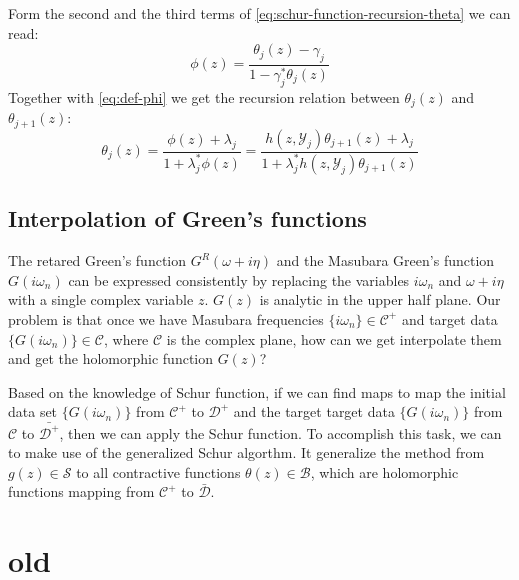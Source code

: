 \documentclass[
	preprint,%
	aps,
	prb,
	showpacs,	
	amsmath, amssymb]{revtex4-2}
\DeclareRobustCommand{\+}{\hstretch{1.25} {\boldsymbol {\mathrel{+}}}}
\newcommand{\Y}{ {\mathcal{Y}} }
\newcommand{\C}{ {\mathcal{C}} }
\newcommand{\D}{ {\mathcal{D}} }
\newcommand{\Dbar}{ {\bar{\mathcal{D}}} }
\newcommand{\B}{ {\mathcal{B}} }
\begin{document}
Form the second and the third terms of \cref{eq:schur-function-recursion-theta}
we can read:
\begin{equation}\label{eq:phi-theta-j}
	\phi(z)
	= \frac{\theta_j(z) - \gamma_j}{1 - \gamma_j^* \theta_j(z)}
\end{equation}
Together with \cref{eq:def-phi} we get the recursion relation between 
$\theta_j(z)$ and $\theta_{j+1}(z)$:
\begin{equation}\label{eq:recursion-relation-theta}
	\theta_j(z) = \frac{\phi(z) + \lambda_j}{1 + \lambda_j^*\phi(z)}
		= \frac{h(z, \Y_j) \theta_{j+1}(z)  + \lambda_j}
			{1 + \lambda_j^*h(z, \Y_j) \theta_{j+1}(z) }
\end{equation}

\subsection{Interpolation of Green's functions}
\label{subsec:interpolation-of-GF}

The retared Green's function $G^R(\omega + i\eta)$ and the Masubara 
Green's function $G(i\omega_n)$ can be expressed consistently by replacing 
the variables $i\omega_n$ and $\omega + i\eta$ with a single complex 
variable $z$. $G(z)$ is analytic in the upper half plane. 
Our problem is that once we have Masubara frequencies $\{i\omega_n\} \in \C^+$ 
and target data $\{ G(i\omega_n)\} \in \C$, where $\C$ is 
the complex plane, how can we get interpolate them and get the 
holomorphic function $G(z)$?

Based on the knowledge of Schur function, if we can find maps 
to map the initial data set $\{ G(i\omega_n)\}$
from $\C^+$ to $\D^+$ and the target 
target data $\{ G(i\omega_n)\}$ from $\C$ to $\bar{\D^+}$, 
then we can apply the Schur function. 
To accomplish this task, we can to make use of the generalized 
Schur algorthm\cite{adamyan2003reconstruction}. It generalize the 
method from $g(z) \in \mathcal{S}$ to all contractive functions 
$\theta(z) \in \B$, which 
are holomorphic functions mapping from $\mathcal{C^+}$ 
to $\Dbar$.	









\section{old}
\end{document}
